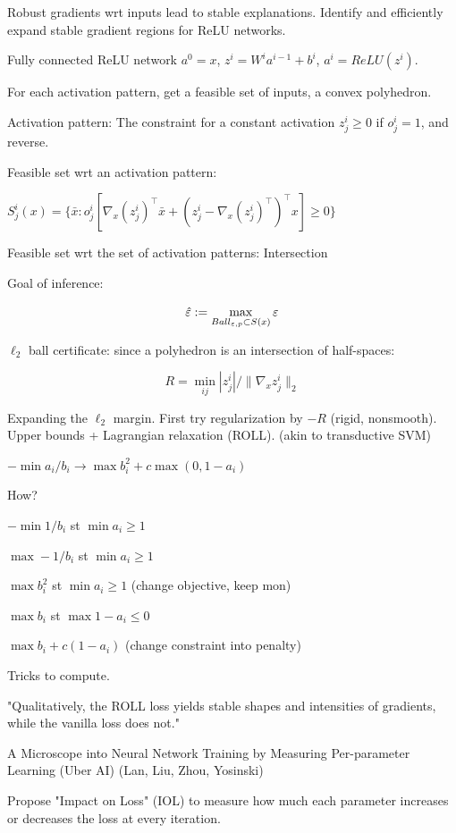 \documentclass[english]{article}
\begin{document}
Robust gradients wrt inputs lead to stable explanations. Identify and efficiently expand stable gradient regions for ReLU networks. 

Fully connected ReLU network $a^0=x$, $z^i = W^i a^{i-1}+b^i$, $a^i = ReLU(z^i)$.

For each activation pattern, get a feasible set of inputs, a convex polyhedron. 

Activation pattern: The constraint for a constant activation $z^i_j \ge 0$ if $o^i_j=1$, and reverse. 

Feasible set wrt an activation pattern: 

$S^i_j(x) = \{ \bar x: o^i_j 
[\nabla_x (z^i_j)^\top \bar x  
+ (z^i_j - \nabla_x (z^i_j)^\top)^\top x] \ge 0\}$

Feasible set wrt the set of activation patterns: Intersection 

Goal of inference:

$$\hat {\varepsilon} := \max_{Ball_{\varepsilon,p}\subset S(x)}\varepsilon$$

$\ell_2$ ball certificate: since a polyhedron is an intersection of half-spaces: 

$$R = \min_{ij} |z^i_j|/\|\nabla_x z^i_j\|_2$$

Expanding the $\ell_2$ margin. First try regularization by $-R$ (rigid, nonsmooth). Upper bounds + Lagrangian relaxation (ROLL). (akin to transductive SVM)

$-\min{a_i/b_i} \to \max b_i^2 + c\max(0,1-a_i)$

How? 

$-\min 1/b_i$ st $\min a_i\ge 1$

$\max - 1/b_i$ st $\min a_i\ge 1$

$\max b_i^2$ st $\min  a_i\ge 1$ (change objective, keep mon)

$\max b_i$ st $\max 1-a_i \le 0$ 

$\max b_i + c(1-a_i)$ (change constraint into penalty)


Tricks to compute. 

"Qualitatively, the ROLL loss yields stable shapes
and intensities of gradients, while the vanilla loss does not."


\item A Microscope into Neural Network
Training by Measuring Per-parameter Learning (Uber AI) (Lan, Liu, Zhou, Yosinski)

Propose "Impact on
Loss" (IOL) to measure how much each
parameter increases or decreases the loss at
every iteration.
\end{document}
